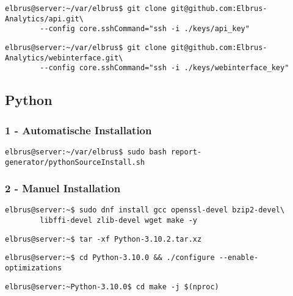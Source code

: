 \documentclass{article}
\begin{document}
	\begin{lstlisting}[caption={Clonen der API Software.}]
		elbrus@server:~/var/elbrus$ git clone git@github.com:Elbrus-Analytics/api.git\
		--config core.sshCommand="ssh -i ./keys/api_key"
	\end{lstlisting}

	\begin{lstlisting}[caption={Clonen der Packet-Importer Software}]
		elbrus@server:~/var/elbrus$ git clone git@github.com:Elbrus-Analytics/webinterface.git\
		--config core.sshCommand="ssh -i ./keys/webinterface_key"
	\end{lstlisting}

	\newpage
	\subsection{Python}
	\lstset{style=commands}
	\subsubsection{1 - Automatische Installation}

	\begin{lstlisting}[caption={Ausführen des 'pythonSourceInstall.sh' Scripts.}]
		elbrus@server:~/var/elbrus$ sudo bash report-generator/pythonSourceInstall.sh
	\end{lstlisting}
	
	\subsubsection{2 - Manuel Installation}
	\begin{lstlisting}[caption={Installieren von benötigten Packeten und Abhängigkeiten.}]
		elbrus@server:~$ sudo dnf install gcc openssl-devel bzip2-devel\
		libffi-devel zlib-devel wget make -y
	\end{lstlisting}
	
	\begin{lstlisting}[caption={Extrahieren der installierent Dateien.}]
		elbrus@server:~$ tar -xf Python-3.10.2.tar.xz
	\end{lstlisting}
	
	\begin{lstlisting}[caption={Wechseln zu source Verzeichniss. Und ausführen des Konfigurations Scripts.}]
		elbrus@server:~$ cd Python-3.10.0 && ./configure --enable-optimizations
	\end{lstlisting}

	\begin{lstlisting}[caption={Starten des build Prozesses.}]
		elbrus@server:~Python-3.10.0$ cd make -j $(nproc)
	\end{lstlisting}
	
\end{document}
